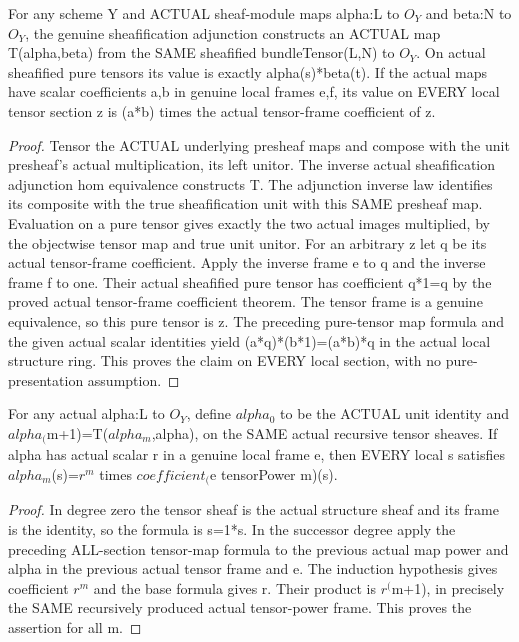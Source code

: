 \begin{lemma}
\label{lem:seven-native-actual-tensor-maps-to-unit}
\leanok
For any scheme Y and ACTUAL sheaf-module maps alpha:L to $O_Y$ and
beta:N to $O_Y$, the genuine sheafification adjunction constructs an
ACTUAL map T(alpha,beta) from the SAME sheafified bundleTensor(L,N)
to $O_Y$. On actual sheafified pure tensors its value is exactly
alpha(s)*beta(t). If the actual maps have scalar coefficients a,b in
genuine local frames e,f, its value on EVERY local tensor section z is
(a*b) times the actual tensor-frame coefficient of z.
\end{lemma}
\begin{proof}
Tensor the ACTUAL underlying presheaf maps and compose with the unit
presheaf's actual multiplication, its left unitor. The inverse actual
sheafification adjunction hom equivalence constructs T. The adjunction
inverse law identifies its composite with the true sheafification unit
with this SAME presheaf map. Evaluation on a pure tensor gives exactly
the two actual images multiplied, by the objectwise tensor map and true
unit unitor. For an arbitrary z let q be its actual tensor-frame
coefficient. Apply the inverse frame e to q and the inverse frame f
to one. Their actual sheafified pure tensor has coefficient q*1=q
by the proved actual tensor-frame coefficient theorem. The tensor
frame is a genuine equivalence, so this pure tensor is z. The preceding
pure-tensor map formula and the given actual scalar identities yield
(a*q)*(b*1)=(a*b)*q in the actual local structure ring. This proves the
claim on EVERY local section, with no pure-presentation assumption.
\end{proof}

\begin{lemma}
\label{lem:seven-native-actual-map-to-unit-powers}
\leanok
For any actual alpha:L to $O_Y$, define $alpha_0$ to be the ACTUAL unit
identity and $alpha_($m+1)=T($alpha_m$,alpha), on the SAME actual recursive
tensor sheaves. If alpha has actual scalar r in a genuine local frame
e, then EVERY local s satisfies
$alpha_m$(s)=$r^m$ times $coefficient_($e tensorPower m)(s).
\end{lemma}
\begin{proof}
In degree zero the tensor sheaf is the actual structure sheaf and its
frame is the identity, so the formula is s=1*s. In the successor degree
apply the preceding ALL-section tensor-map formula to the previous
actual map power and alpha in the previous actual tensor frame and e.
The induction hypothesis gives coefficient $r^m$ and the base formula
gives r. Their product is $r^($m+1), in precisely the SAME recursively
produced actual tensor-power frame. This proves the assertion for all m.
\end{proof}

